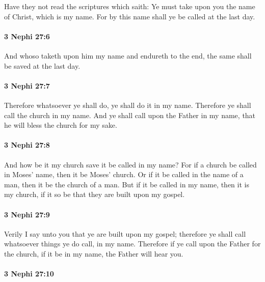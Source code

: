 			Have they not read the scriptures which saith:
			Ye must take upon you the name of Christ,
			which is my name.
			For by this name shall ye be called at the last day.

		\paragraph{3 Nephi 27:6} %
			\label{3NEPHI-27-6}

			And whoso taketh upon him my name and endureth to the end,
			the same shall be saved at the last day.

		\paragraph{3 Nephi 27:7} %
			\label{3NEPHI-27-7}

			Therefore whatsoever ye shall do,
			ye shall do it in my name.
			Therefore ye shall call the church in my name.
			And ye shall call upon the Father in my name,
			that he will bless the church for my sake.

		\paragraph{3 Nephi 27:8} %
			\label{3NEPHI-27-8}

			And how be it my church save it be called in my name?
			For if a church be called in Moses' name, then it be Moses' church.
			Or if it be called in the name of a man, then it be the church of a man.
			But if it be called in my name, then it is my church,
			if it so be that they are built upon my gospel.

		\paragraph{3 Nephi 27:9} %
			\label{3NEPHI-27-9}

			Verily I say unto you that ye are built upon my gospel;
			therefore ye shall call whatsoever things ye do call, in my name.
			Therefore if ye call upon the Father for the church,
			if it be in my name, the Father will hear you.

		\paragraph{3 Nephi 27:10} %
			\label{3NEPHI-27-10}

